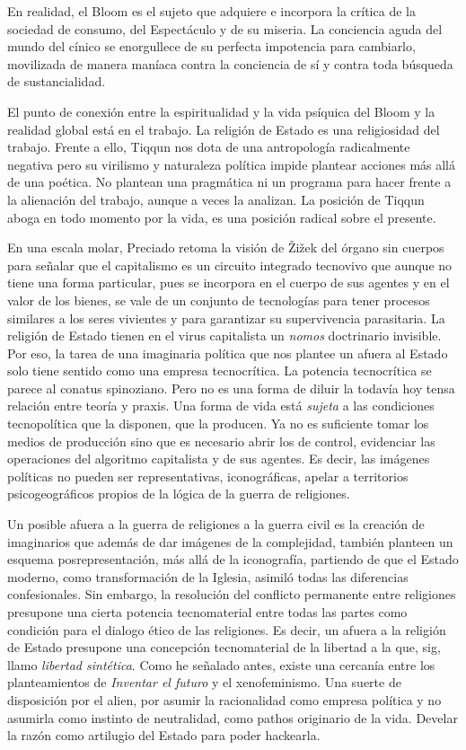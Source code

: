 En realidad, el Bloom es el sujeto que adquiere e incorpora la crítica de la sociedad de consumo, del Espectáculo y de su miseria. La conciencia aguda del mundo del cínico se enorgullece de su perfecta impotencia para cambiarlo, movilizada de manera maníaca contra la conciencia de sí y contra toda búsqueda de sustancialidad.

El punto de conexión entre la espiritualidad y la vida psíquica del Bloom y la realidad global está en el trabajo. La religión de Estado es una religiosidad del trabajo. Frente a ello, Tiqqun nos dota de una antropología radicalmente negativa pero su virilismo y naturaleza política impide plantear acciones más allá de una poética. No plantean una pragmática ni un programa para hacer frente a la alienación del trabajo, aunque a veces la analizan. La posición de Tiqqun aboga en todo momento por la vida, es una posición radical sobre el presente.

En una escala molar, Preciado retoma la visión de Žižek del órgano sin cuerpos para señalar que el capitalismo es un circuito integrado tecnovivo que aunque no tiene una forma particular, pues se incorpora en el cuerpo de sus agentes y en el valor de los bienes, se vale de un conjunto de tecnologías para tener procesos similares a los seres vivientes y para garantizar su supervivencia parasitaria. La religión de Estado tienen en el virus capitalista un \emph{nomos} doctrinario invisible. Por eso, la tarea de una imaginaria política que nos plantee un afuera al Estado solo tiene sentido como una empresa tecnocrítica. La potencia tecnocrítica se parece al conatus spinoziano. Pero no es una forma de diluir la todavía hoy tensa relación entre teoría y praxis. Una forma de vida está \emph{sujeta} a las condiciones tecnopolítica que la disponen, que la producen. Ya no es suficiente tomar los medios de producción sino que es necesario abrir los de control, evidenciar las operaciones del algoritmo capitalista y de sus agentes. Es decir, las imágenes políticas no pueden ser representativas, iconográficas, apelar a territorios psicogeográficos propios de la lógica de la guerra de religiones.

Un posible afuera a la guerra de religiones a la guerra civil es la creación de imaginarios que además de dar imágenes de la complejidad, también planteen un esquema posrepresentación, más allá de la iconografía, partiendo de que el Estado moderno, como transformación de la Iglesia, asimiló todas las diferencias confesionales. Sin embargo, la resolución del conflicto permanente entre religiones presupone una cierta potencia tecnomaterial entre todas las partes como condición para el dialogo ético de las religiones. Es decir, un afuera a la religión de Estado presupone una concepción tecnomaterial de la libertad a la que, sig\autocite{srnicekInventarFuturoPoscapitalismo2017}, llamo \emph{libertad sintética}. Como he señalado antes, existe una cercanía entre los planteamientos de \emph{Inventar el futuro} y el xenofeminismo. Una suerte de disposición por el alien, por asumir la racionalidad como empresa política y no asumirla como instinto de neutralidad, como pathos originario de la vida. Develar la razón como artilugio del Estado para poder hackearla.


